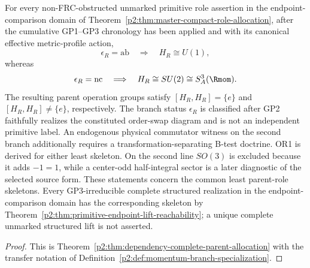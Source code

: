\documentclass[12pt,a4paper]{article}
\begin{document}
\begin{theorem}
\label{p2:thm:finite-realization-momentum-selection}
For every non-FRC-obstructed unmarked primitive role assertion in the
endpoint-comparison domain of
Theorem~\ref{p2:thm:master-compact-role-allocation}, after the cumulative
GP1--GP3 chronology has been applied and with its canonical effective
metric-profile action,
\[
 \epsilon_R=\mathrm{ab}
 \quad\Longrightarrow\quad H_R\cong U(1),
\]
whereas
\[
 \epsilon_R=\mathrm{nc}
 \quad\Longrightarrow\quad
 H_R\cong SU(2)\cong S^3_A(\Rmom).
\]
The resulting parent operation groups satisfy \([H_R,H_R]=\{e\}\) and
\([H_R,H_R]\ne\{e\}\), respectively.
The branch status \(\epsilon_R\) is classified after GP2 faithfully realizes
the constituted order-swap diagram and is not an independent primitive label.
An endogenous physical commutator witness on the second
branch additionally requires a transformation-separating B-test doctrine.
OR1 is derived for either least skeleton.  On the second
line \(SO(3)\) is excluded because it adds \(-1=1\), while a center-odd
half-integral sector is a later diagnostic of the selected source form.
These statements concern the common least parent-role skeletons.  Every
GP3-irreducible complete structured realization in the endpoint-comparison
domain has the corresponding skeleton
by Theorem~\ref{p2:thm:primitive-endpoint-lift-reachability}; a unique complete
unmarked structured lift is not asserted.
\end{theorem}

\begin{proof}
This is Theorem~\ref{p2:thm:dependency-complete-parent-allocation} with the
transfer notation of
Definition~\ref{p2:def:momentum-branch-specialization}.
\end{proof}
\end{document}
